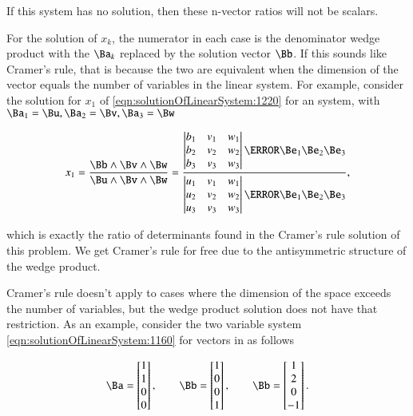 If this system has no solution, then these n-vector ratios will not be scalars.

For the solution of \( x_k \), the numerator in each case is the denominator wedge product with the \( \Ba_k \) replaced by the solution vector \( \Bb \).
If this sounds like Cramer's rule, that is because the two are equivalent when the dimension of the vector equals the number of variables in the linear system.
For example, consider the solution for \( x_1 \) of \cref{eqn:solutionOfLinearSystem:1220} for an  system, with \( \Ba_1 = \Bu, \Ba_2 = \Bv, \Ba_3 = \Bw \)

\begin{equation}\label{eqn:solutionOfLinearSystem:1260}
x_1 =
\frac{ \Bb \wedge \Bv \wedge \Bw }
{ \Bu \wedge \Bv \wedge \Bw }
=
\frac{
\begin{vmatrix}
b_1 & v_1 & w_1 \\
b_2 & v_2 & w_2 \\
b_3 & v_3 & w_3 \\
\end{vmatrix}
\cancel{\Be_1 \Be_2 \Be_3}
}
{
\begin{vmatrix}
u_1 & v_1 & w_1 \\
u_2 & v_2 & w_2 \\
u_3 & v_3 & w_3 \\
\end{vmatrix}
\cancel{\Be_1 \Be_2 \Be_3}
},
\end{equation}

which is exactly the ratio of determinants found in the Cramer's rule solution of this problem.  We get Cramer's rule for free due to the antisymmetric structure of the wedge product.

Cramer's rule doesn't apply to cases where the dimension of the space exceeds the number of variables, but the wedge product solution does not have that restriction.  As an example, consider the two variable system \cref{eqn:solutionOfLinearSystem:1160} for vectors in  as follows

\begin{equation}\label{eqn:solutionOfLinearSystem:1280}
\Ba =
\begin{bmatrix}
1 \\
1 \\
0 \\
0
\end{bmatrix}, \qquad
\Bb =
\begin{bmatrix}
1 \\
0 \\
0 \\
1
\end{bmatrix}, \qquad
\Bb =
\begin{bmatrix}
1 \\
2 \\
0 \\
-1
\end{bmatrix}.
\end{equation}

